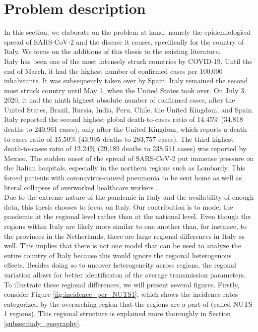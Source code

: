\documentclass[12pt]{article}
\begin{document}
	\newpage
	\section{Problem description} \label{sec:problem_description}
	In this section, we elaborate on the problem at hand, namely the epidemiological spread of SARS-CoV-2 and the disease it causes, specifically for the country of Italy. We focus on the additions of this thesis to the existing literature. \\
	
	Italy has been one of the most intensely struck countries by COVID-19. Until the end of March, it had the highest number of confirmed cases per 100,000 inhabitants. It was subsequently taken over by Spain. Italy remained the second most struck country until May 1, when the United States took over. On July 3, 2020, it had the ninth highest absolute number of confirmed cases, after the United States, Brazil, Russia, India, Peru, Chile, the United Kingdom, and Spain. Italy reported the second highest global death-to-cases ratio of 14.45\% (34,818 deaths to 240,961 cases), only after the United Kingdom, which reports a death-to-cases ratio of 15.50\% (43,995 deaths to 283,757 cases). The third highest death-to-cases ratio of 12.24\% (29,189 deaths to 238,511 cases) was reported by Mexico. The sudden onset of the spread of SARS-CoV-2 put immense pressure on the Italian hospitals, especially in the northern regions such as Lombardy. This forced patients with coronavirus-caused pneumonia to be sent home as well as literal collapses of overworked healthcare workers \parencite{horowitz2020healthcare}. \\
	
	Due to the extreme nature of the pandemic in Italy and the availability of enough data, this thesis chooses to focus on Italy. Our contribution is to model the pandemic at the regional level rather than at the national level. Even though the regions within Italy are likely more similar to one another than, for instance, to the provinces in the Netherlands, there are large regional differences in Italy as well. This implies that there is not one model that can be used to analyze the entire country of Italy because this would ignore the regional heterogenous effects. Besides doing so to uncover heterogeneity across regions, the regonal variation allows for better identificaton of the average transmission parameters. To illustrate these regional differences, we will present several figures. Firstly, consider Figure \ref{fig:incidence_per_NUTS1}, which shows the incidence rates categorized by the overarching region that the regions are a part of (called NUTS 1 regions). This regional structure is explained more thoroughly in Section \ref{subsec:italy_geography}. \\
	
\end{document}
